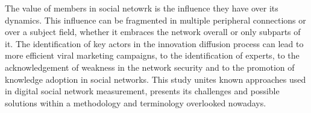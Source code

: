 The value of members in social netowrk is the influence they have over its
dynamics. This influence can be fragmented in multiple peripheral connections or
over a subject field, whether it embraces the network overall or only subparts of
it. The identification of key actors in the innovation diffusion process can lead
to more efficient viral marketing campaigns, to the identification of experts, to
the acknowledgement of weakness in the network security and to the promotion of
knowledge adoption in social networks. This study unites known approaches used in
digital social network measurement, presents its challenges and possible
solutions within a methodology and terminology overlooked nowadays.